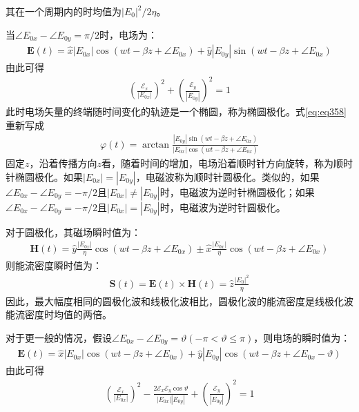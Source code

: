 \documentclass{article}
\numberwithin{equation}{section}
\renewcommand{\vec}[1]{\boldsymbol{#1}}
\begin{document}
其在一个周期内的时均值为$|E_0|^2/2\eta$。\par
当$\angle E_{0x}-\angle E_{0y}=\pi/2$时，电场为：
\begin{align}
    \label{eq:eq361}
    \mathcal{\vec{E}}(t)=\hat{x}|E_{0x}|\cos(wt-\beta z+\angle E_{0x})+\hat{y}|E_{0y}|\sin(wt-\beta z+\angle E_{0x})
\end{align}
由此可得
\begin{align}
    \label{eq:eq362}
    \left(\frac{\mathcal{E}_x}{|E_{0x}|}\right)^2+\left(\frac{\mathcal{E}_y}{|E_{0y}|}\right)^2=1
\end{align}
此时电场矢量的终端随时间变化的轨迹是一个椭圆，称为椭圆极化。式\ref{eq:eq358}重新写成
\begin{align}
    \label{eq:eq363}
    \varphi(t)=\arctan\frac{|E_{0y}|\sin(wt-\beta z+\angle E_{0x})}{|E_{0x}|\cos(wt-\beta z+\angle E_{0x})}
\end{align}
固定$z$，沿着传播方向$z$看，随着时间的增加，电场沿着顺时针方向旋转，称为顺时针椭圆极化。如果$|E_{0x}|=|E_{0y}|$，电磁波称为顺时针圆极化。类似的，如果$\angle E_{0x}-\angle E_{0y}=-\pi/2$且$|E_{0x}|\neq|E_{0y}|$时，电磁波为逆时针椭圆极化；如果$\angle E_{0x}-\angle E_{0y}=-\pi/2$且$|E_{0x}|=|E_{0y}|$时，电磁波为逆时针圆极化。
\par
对于圆极化，其磁场瞬时值为：
\begin{align}
    \label{eq:eq364}
    \mathcal{\vec{H}}(t)=\hat{y}\frac{|E_{0x}|}{\eta}\cos(wt-\beta z+\angle E_{0x})\pm\hat{x}\frac{|E_{0x}|}{\eta}\cos(wt-\beta z+\angle E_{0x})
\end{align}
则能流密度瞬时值为：
\begin{align}
    \label{eq:eq365}
    \mathcal{\vec{S}}(t)=\mathcal{\vec{E}}(t)\times\mathcal{\vec{H}}(t)=\hat{z}\frac{|E_0|^2}{\eta}
\end{align}
因此，最大幅度相同的圆极化波和线极化波相比，圆极化波的能流密度是线极化波能流密度时均值的两倍。\par
对于更一般的情况，假设$\angle E_{0x}-\angle E_{0y}=\vartheta(-\pi<\vartheta\leq\pi)$，则电场的瞬时值为：
\begin{align}
    \label{eq:eq366}
    \mathcal{\vec{E}}(t)=\hat{x}|E_{0x}|\cos(wt-\beta z+\angle E_{0x})+\hat{y}|E_{0y}|\cos(wt-\beta z+\angle E_{0x}-\vartheta)
\end{align}
由此可得
\begin{align}
    \label{eq:eq367}
    \left(\frac{\mathcal{E}_x}{|E_{0x}|}\right)^2-\frac{2\mathcal{E}_x\mathcal{E}_y\cos\vartheta}{|E_{0x}||E_{0y}|}+\left(\frac{\mathcal{E}_y}{|E_{0y}|}\right)^2=1
\end{align}
\end{document}
